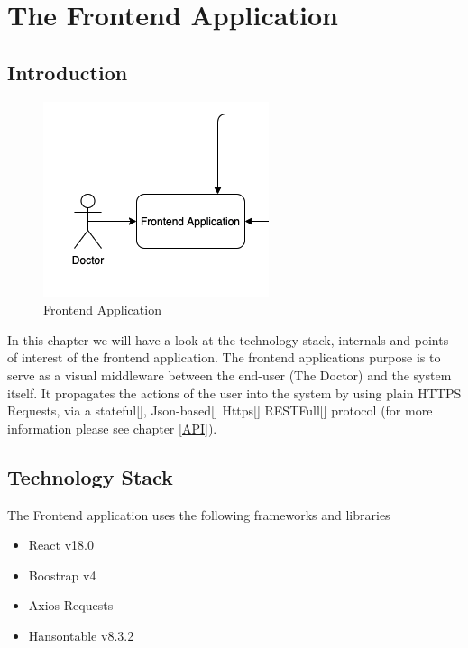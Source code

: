 \chapter{The Frontend Application}
\label{frontend}
	\section{Introduction}
		\begin{figure}[H]
			\iftrue
			\caption{Frontend Application}
			\centering
			\includegraphics[scale=0.5]{figures/frontend}
			\fi
		\end{figure}
		In this chapter we will have a look at the technology stack, internals and points of interest of the frontend application. The
		frontend applications purpose is to serve as a visual middleware between the end-user (The Doctor) and the system itself. It 
		propagates the actions of the user into the system by using plain HTTPS Requests, via a stateful[\cite{session-rfc6265}],
		Json-based[\cite{json-rfc7159}] Https[\cite{rfc2818}] RESTFull[\cite{restful-rfc7231}]
		protocol (for more information please see chapter \ref{API}).
	\section{Technology Stack}
		The Frontend application uses the following frameworks and libraries
		\begin{itemize}
			\item React v18.0
			\item Boostrap v4
			\item Axios Requests
			\item Hansontable v8.3.2
		\end{itemize}
